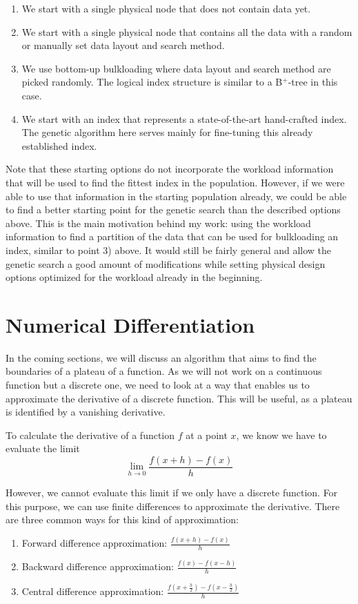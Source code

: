 \begin{enumerate}
    \item We start with a single physical node that does not contain data yet.
    \item We start with a single physical node that contains all the data with a random or manually set data layout and search method.
    \item We use bottom-up bulkloading where data layout and search method are picked randomly. The logical index structure is similar to a B$^+$-tree in this case.
    \item We start with an index that represents a state-of-the-art hand-crafted index. The genetic algorithm here serves mainly for fine-tuning this already established index.
\end{enumerate}
\noindent Note that these starting options do not incorporate the workload information that will be used to find the fittest index in the population. However, if we were able to use that information in the starting population already, we could be able to find a better starting point for the genetic search than the described options above. This is the main motivation behind my work: using the workload information to find a partition of the data that can be used for bulkloading an index, similar to point 3) above. It would still be fairly general and allow the genetic search a good amount of modifications while setting physical design options optimized for the workload already in the beginning.


\section{Numerical Differentiation}\label{bg:numerical}
In the coming sections, we will discuss an algorithm that aims to find the boundaries of a plateau of a function. As we will not work on a continuous function but a discrete one, we need to look at a way that enables us to approximate the derivative of a discrete function. This will be useful, as a plateau is identified by a vanishing derivative.

To calculate the derivative of a function $f$ at a point $x$, we know we have to evaluate the limit 
$$
\lim_{h \rightarrow 0} \frac{f(x+h) - f(x)}{h}
$$

However, we cannot evaluate this limit if we only have a discrete function. For this purpose, we can use finite differences to approximate the derivative. There are three common ways for this kind of approximation:
\begin{enumerate}
    \item Forward difference approximation: $\frac{f(x + h) - f(x)}{h}$
    \item Backward difference approximation: $\frac{f(x) - f(x-h)}{h}$
    \item Central difference approximation: $\frac{f(x + \frac{h}{2}) - f(x - \frac{h}{2})}{h}$
\end{enumerate}

